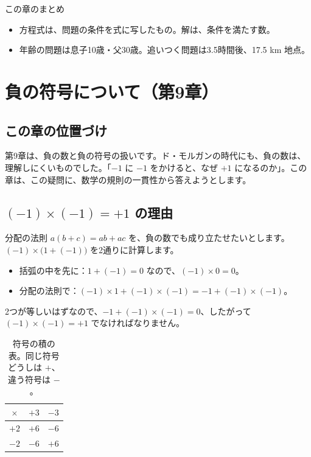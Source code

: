 \documentclass[a4paper,11pt,openany]{ltjsbook}
\begin{document}
\begin{pointbox}{この章のまとめ}
\begin{itemize}[leftmargin=*]
\item 方程式は、問題の条件を式に写したもの。解は、条件を満たす数。
\item 年齢の問題は息子10歳・父30歳。追いつく問題は3.5時間後、17.5 km 地点。
\end{itemize}
\end{pointbox}

\chapter{負の符号について（第9章）}

\section{この章の位置づけ}

第9章は、負の数と負の符号の扱いです。ド・モルガンの時代にも、負の数は、理解しにくいものでした。「$-1$ に $-1$ をかけると、なぜ $+1$ になるのか」。この章は、この疑問に、数学の規則の一貫性から答えようとします。

\section{$(-1)\times(-1)=+1$ の理由}

分配の法則 $a(b+c)=ab+ac$ を、負の数でも成り立たせたいとします。$(-1)\times\bigl(1+(-1)\bigr)$ を2通りに計算します。

\begin{itemize}[leftmargin=*]
\item 括弧の中を先に：$1+(-1)=0$ なので、$(-1)\times0=0$。
\item 分配の法則で：$(-1)\times1+(-1)\times(-1)=-1+(-1)\times(-1)$。
\end{itemize}

2つが等しいはずなので、$-1+(-1)\times(-1)=0$、したがって $(-1)\times(-1)=+1$ でなければなりません。

\begin{table}[htbp]
\centering
\begin{tabular}{c|cc}
\toprule
$\times$ & $+3$ & $-3$\\
\midrule
$+2$ & $+6$ & $-6$\\
$-2$ & $-6$ & $+6$\\
\bottomrule
\end{tabular}
\caption{符号の積の表。同じ符号どうしは $+$、違う符号は $-$。}
\end{table}
\end{document}
